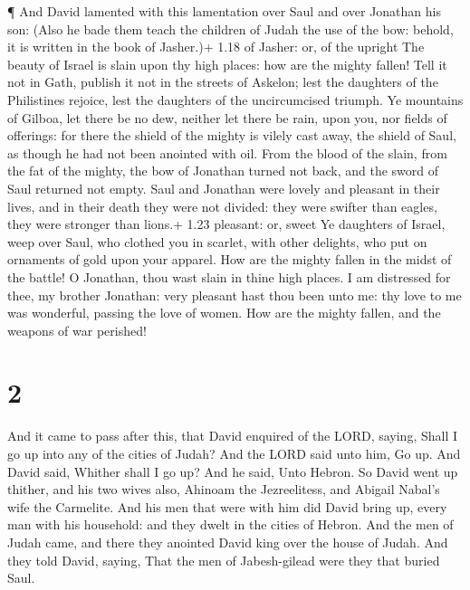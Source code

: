 ¶ And David lamented with this lamentation over Saul and
over Jonathan his son:  (Also he bade them teach the
children of Judah the use of the bow: behold, it is written in the book
of Jasher.)+ 1.18 of Jasher: or, of the upright  The beauty
of Israel is slain upon thy high places: how are the mighty fallen!
 Tell it not in Gath, publish it not in the streets of
Askelon; lest the daughters of the Philistines rejoice, lest the
daughters of the uncircumcised triumph.  Ye mountains of
Gilboa, let there be no dew, neither let there be rain, upon you, nor
fields of offerings: for there the shield of the mighty is vilely cast
away, the shield of Saul, as though he had not been anointed with oil.
 From the blood of the slain, from the fat of the mighty,
the bow of Jonathan turned not back, and the sword of Saul returned not
empty.  Saul and Jonathan were lovely and pleasant in their
lives, and in their death they were not divided: they were swifter than
eagles, they were stronger than lions.+ 1.23 pleasant: or, sweet
 Ye daughters of Israel, weep over Saul, who clothed you in
scarlet, with other delights, who put on ornaments of gold upon your
apparel.  How are the mighty fallen in the midst of the
battle! O Jonathan, thou wast slain in thine high places. 
I am distressed for thee, my brother Jonathan: very pleasant hast thou
been unto me: thy love to me was wonderful, passing the love of women.
 How are the mighty fallen, and the weapons of war
perished!

\hypertarget{section-1}{%
\section{2}\label{section-1}}

 And it came to pass after this, that David enquired of the
LORD, saying, Shall I go up into any of the cities of Judah? And the
LORD said unto him, Go up. And David said, Whither shall I go up? And he
said, Unto Hebron.  So David went up thither, and his two
wives also, Ahinoam the Jezreelitess, and Abigail Nabal's wife the
Carmelite.  And his men that were with him did David bring
up, every man with his household: and they dwelt in the cities of
Hebron.  And the men of Judah came, and there they anointed
David king over the house of Judah. And they told David, saying, That
the men of Jabesh-gilead were they that buried Saul.

